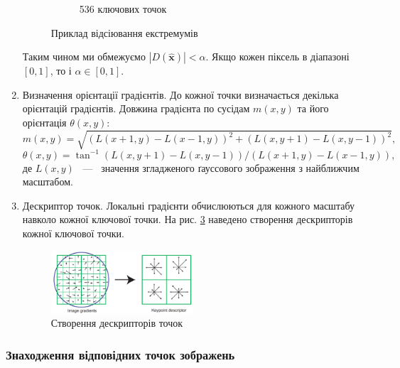 \begin{enumerate}
\begin{figure}[H]
\begin{subfigure}[c]{0.3\textwidth}
                  \caption{ 536 ключових точок
                      \label{fig:swift5}
                  }
              \end{subfigure}
              \caption{Приклад відсіювання екстремумів \cite{bib:sift}
                  \label{fig:extremums_filtering}
              }
          \end{figure}
          Таким чином  ми обмежуємо $|D(\widehat{\boldsymbol{x}})| < \alpha$.
          Якщо кожен піксель в діапазоні $[0,1]$, то і
          $ \alpha \in [0,1]$.
    \item Визначення орієнтації градієнтів.
          До кожної точки визначається декілька орієнтацій градієнтів.
          Довжина градієнта по сусідам $m(x,y)$ та його орієнтація $\theta(x,y)$:
          \begin{equation*}
              m(x,y) = \sqrt{(L(x+1,y) - L(x-1,y))^2 + (L(x,y+1) - L(x,y-1))^2},
          \end{equation*}
          \begin{equation*}
              \theta(x,y) = \tan^{-1} (L(x,y+1) - L(x,y-1))/(L(x+1,y) - L(x-1,y)),
          \end{equation*}
          де $L(x,y)$ ~---~ значення згладженого ґауссового зображення з найближчим масштабом.

    \item Дескриптор точок.
          Локальні градієнти обчислюються для кожного масштабу навколо кожної ключової точки.
          На рис. \ref{fig:swift6} наведено створення дескрипторів кожної ключової точки.
          \begin{figure}[H]
              \centering
              \includegraphics[width=0.5\textwidth]{images/sift6}
              \caption{Створення дескрипторів точок \cite{bib:sift}
                  \label{fig:swift6}
              }
          \end{figure}
\end{enumerate}

\subsubsection{Знаходження відповідних точок зображень}

